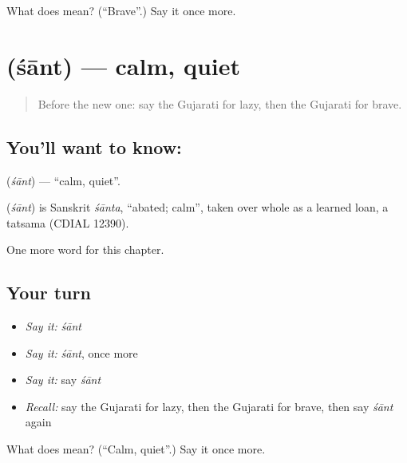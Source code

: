 \begin{tcolorbox}[breakable,colback=teal!4,colframe=teal!35!black,title={Before you move on}]
What does  mean? (\textquotedblleft{}Brave\textquotedblright{}.) Say it once more.
\end{tcolorbox}
\section[\texorpdfstring{\gu{શાંત} (śānt)}{શાંત (śānt)}]{ (śānt) — calm, quiet}

\label{lesson:GU-C134-sant}



\begin{quote}
Before the new one: say the Gujarati for lazy, then the Gujarati for brave.
\end{quote}

\subsection*{You'll want to know: }
\textbf{} (\emph{śānt}) — \textquotedblleft{}calm, quiet\textquotedblright{}.

\begin{cousinweb}
\textbf{} (\emph{śānt}) is Sanskrit \emph{śānta}, \textquotedblleft{}abated; calm\textquotedblright{}, taken over whole as a learned loan, a tatsama (CDIAL 12390).
\end{cousinweb}

\begin{grammarlens}[title={What you've built}]
One more word for this chapter.
\end{grammarlens}

\subsection*{Your turn}
\begin{itemize}
\raggedright
  \item \emph{Say it:} \emph{śānt}
  \item \emph{Say it:} \emph{śānt}, once more
  \item \emph{Say it:} say \emph{śānt}
  \item \emph{Recall:} say the Gujarati for lazy, then the Gujarati for brave, then say \emph{śānt} again
\end{itemize}

\begin{tcolorbox}[breakable,colback=teal!4,colframe=teal!35!black,title={Before you move on}]
What does  mean? (\textquotedblleft{}Calm, quiet\textquotedblright{}.) Say it once more.
\end{tcolorbox}
